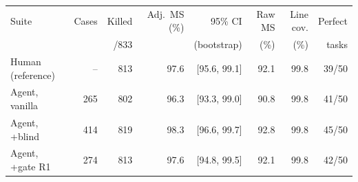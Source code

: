 \begin{tabular}{@{}lrrrrrrr@{}}
\toprule
Suite & Cases & Killed & Adj.\ MS (\%) & 95\% CI & Raw MS & Line cov. & Perfect\\
 &  & /833 &  & (bootstrap) & (\%) & (\%) & tasks\\
\midrule
Human (reference) & -- & 813 & 97.6 & [95.6, 99.1] & 92.1 & 99.8 & 39/50\\
Agent, vanilla & 265 & 802 & 96.3 & [93.3, 99.0] & 90.8 & 99.8 & 41/50\\
Agent, +blind & 414 & 819 & 98.3 & [96.6, 99.7] & 92.8 & 99.8 & 45/50\\
Agent, +gate R1 & 274 & 813 & 97.6 & [94.8, 99.5] & 92.1 & 99.8 & 42/50\\
\bottomrule
\end{tabular}

